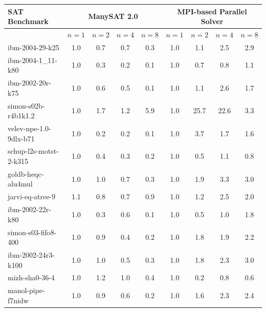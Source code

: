 \documentclass[letterpaper, compsoc, conference]{IEEEtran}
\begin{document}
\begin{table}[htbp]
    \begin{center}
    \begin{tabular}{|l|c|c|c|c|c|c|c|c|}
        \hline
        {\textbf{SAT Benchmark}} & \multicolumn{4}{c|}{\bf ManySAT 2.0} & \multicolumn{4}{c|}{\bf MPI-based Parallel Solver} \\
        \hline
        & $n=1$ & $n=2$ & $n=4$ & $n=8$ & $n=1$ & $n=2$ & $n=4$ & $n=8$ \\
        \hline
        ibm-2004-29-k25                          &    1.0 &    0.7 &    0.7 &    0.3 &    1.0 &    1.1 &    2.5 &    2.9 \\
        ibm-2004-1\_11-k80                       &    1.0 &    0.3 &    0.2 &    0.1 &    1.0 &    0.7 &    0.8 &    1.1 \\
        ibm-2002-20r-k75                         &    1.0 &    0.6 &    0.5 &    0.1 &    1.0 &    1.1 &    2.6 &    1.7 \\
        simon-s02b-r4b1k1.2                      &    1.0 &    1.7 &    1.2 &    5.9 &    1.0 &   25.7 &   22.6 &    3.3 \\
        velev-npe-1.0-9dlx-b71                   &    1.0 &    0.2 &    0.2 &    0.1 &    1.0 &    3.7 &    1.7 &    1.6 \\
        schup-l2s-motst-2-k315                   &    1.0 &    0.4 &    0.3 &    0.2 &    1.0 &    0.5 &    1.1 &    0.8 \\
        goldb-heqc-alu4mul                       &    1.0 &    1.0 &    0.7 &    0.3 &    1.0 &    1.9 &    3.3 &    3.0 \\
        jarvi-eq-atree-9                         &    1.1 &    0.8 &    0.7 &    0.9 &    1.0 &    1.2 &    2.5 &    2.0 \\
        ibm-2002-22r-k80                         &    1.0 &    0.3 &    0.6 &    0.1 &    1.0 &    0.5 &    1.0 &    1.8 \\
        simon-s03-fifo8-400                      &    1.0 &    0.9 &    0.4 &    0.2 &    1.0 &    1.8 &    1.9 &    2.2 \\
        ibm-2002-24r3-k100                       &    1.0 &    1.0 &    0.5 &    0.3 &    1.0 &    1.8 &    2.3 &    3.0 \\
        mizh-sha0-36-4                           &    1.0 &    1.2 &    1.0 &    0.4 &    1.0 &    0.2 &    0.8 &    0.6 \\
        manol-pipe-f7nidw                        &    1.0 &    0.9 &    0.6 &    0.2 &    1.0 &    1.6 &    2.3 &    2.4 \\

\end{tabular}
\end{center}
\end{table}
\end{document}
